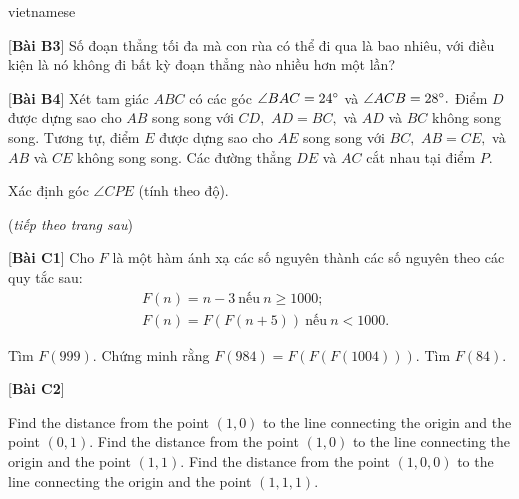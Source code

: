 \documentclass{article}
\begin{document}
\begin{otherlanguage*}{vietnamese}
\begin{problem*}{[\textbf{Bài B3}]}
    Số đoạn thẳng tối đa mà con rùa có thể đi qua là bao nhiêu, với điều kiện là nó không đi bất kỳ đoạn thẳng nào nhiều hơn một lần?
\end{problem*}

\begin{problem*}{[\textbf{Bài B4}]}
    Xét tam giác $ABC$ có các góc $\angle BAC = 24^\circ$ và $\angle ACB = 28^\circ.$ Điểm $D$ được dựng sao cho $AB$ song song với $CD,$ $AD=BC,$ và $AD$ và $BC$ không song song. 
    Tương tự, điểm $E$ được dựng sao cho $AE$ song song với $BC,$ $AB=CE,$ và $AB$ và $CE$ không song song. Các đường thẳng $DE$ và $AC$ cắt nhau tại điểm $P.$

    Xác định góc $\angle CPE$ (tính theo độ).
\end{problem*}

(\textit{tiếp theo trang sau})
\newpage
\begin{problem*}{[\textbf{Bài C1}]}
    Cho $F$ là một hàm ánh xạ các số nguyên thành các số nguyên theo các quy tắc sau:
    \[
        \begin{aligned}
            &F(n) = n - 3\ \text{nếu}\ n \ge 1000;\\
            &F(n) = F(F(n+ 5))\ \text{nếu}\ n < 1000.
        \end{aligned}
    \]

    \begin{enumerate}[topsep=0pt, partopsep=0pt, itemsep=0pt]
        \ii Tìm $F(999).$
        \ii Chứng minh rằng $F(984) = F(F(F(1004))).$
        \ii Tìm $F(84).$
    \end{enumerate}
\end{problem*}

\begin{problem*}{[\textbf{Bài C2}]}
    \begin{enumerate}[topsep=0pt, partopsep=0pt, itemsep=0pt]
        \ii Find the distance from the point $(1,0)$ to the line connecting the origin and the point $(0,1).$
        \ii Find the distance from the point $(1,0)$ to the line connecting the origin and the point $(1,1).$
        \ii Find the distance from the point $(1,0,0)$ to the line connecting the origin and the point $(1,1,1).$
    \end{enumerate}
\end{problem*}


\end{otherlanguage*}
\end{document}
